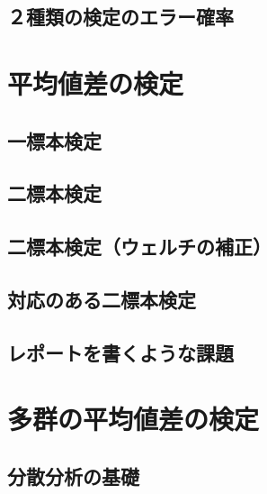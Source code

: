 \documentclass[
  a4paper,
]{ltjsbook}
\begin{document}
\section{２種類の検定のエラー確率}\label{ux7a2eux985eux306eux691cux5b9aux306eux30a8ux30e9ux30fcux78baux7387}


\chapter{平均値差の検定}\label{ux5e73ux5747ux5024ux5deeux306eux691cux5b9a}

\section{一標本検定}\label{ux4e00ux6a19ux672cux691cux5b9a}

\section{二標本検定}\label{ux4e8cux6a19ux672cux691cux5b9a}

\section{二標本検定（ウェルチの補正）}\label{ux4e8cux6a19ux672cux691cux5b9aux30a6ux30a7ux30ebux30c1ux306eux88dcux6b63}

\section{対応のある二標本検定}\label{ux5bfeux5fdcux306eux3042ux308bux4e8cux6a19ux672cux691cux5b9a}

\section{レポートを書くような課題}\label{ux30ecux30ddux30fcux30c8ux3092ux66f8ux304fux3088ux3046ux306aux8ab2ux984c}


\chapter{多群の平均値差の検定}\label{ux591aux7fa4ux306eux5e73ux5747ux5024ux5deeux306eux691cux5b9a}

\section{分散分析の基礎}\label{ux5206ux6563ux5206ux6790ux306eux57faux790e}
\end{document}
